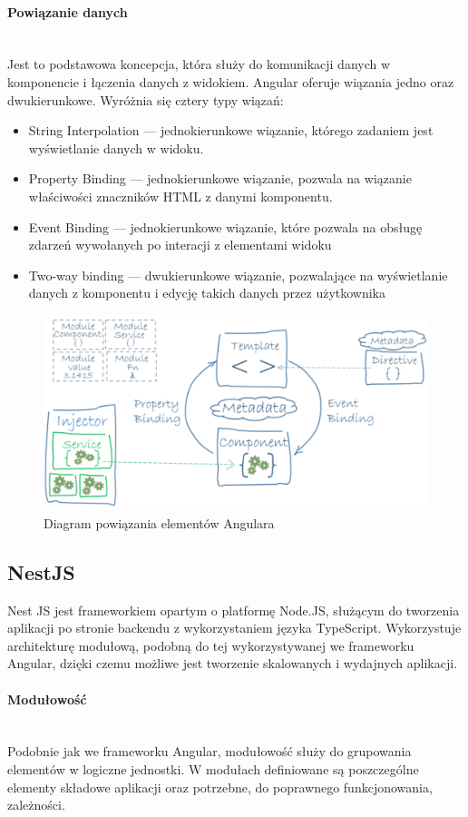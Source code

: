 \paragraph{Powiązanie danych}\mbox{}\\
Jest to podstawowa koncepcja, która służy do komunikacji danych w komponencie i łączenia danych z widokiem. Angular oferuje wiązania jedno oraz dwukierunkowe. Wyróżnia się cztery typy wiązań:
\begin{itemize}
  \item String Interpolation --- jednokierunkowe wiązanie, którego zadaniem jest wyświetlanie danych w widoku. 
  \item Property Binding --- jednokierunkowe wiązanie, pozwala na wiązanie właściwości znaczników HTML z danymi komponentu.
  \item Event Binding --- jednokierunkowe wiązanie, które pozwala na obsługę zdarzeń wywołanych po interacji z elementami widoku
  \item Two-way binding --- dwukierunkowe wiązanie, pozwalające na wyświetlanie danych z komponentu i edycję takich danych przez użytkownika 
\end{itemize}

\begin{figure}[ht]
	\centering
		\includegraphics[width=0.6\linewidth]{imgs/ang-diag-1.png}
	\caption{Diagram powiązania elementów Angulara}
	\label{fig:wiazanie-elementow-angular}
\end{figure}

\subsection{NestJS}
Nest JS jest frameworkiem opartym o platformę Node.JS, służącym do tworzenia aplikacji po stronie backendu z wykorzystaniem języka TypeScript. Wykorzystuje architekturę modułową, podobną do tej wykorzystywanej we frameworku Angular, dzięki czemu możliwe jest tworzenie skalowanych i wydajnych aplikacji.
\paragraph{Modułowość}\mbox{}\\
Podobnie jak we frameworku Angular, modułowość służy do grupowania elementów w logiczne jednostki. W modułach definiowane są poszczególne elementy składowe aplikacji oraz potrzebne, do poprawnego funkcjonowania, zależności.

